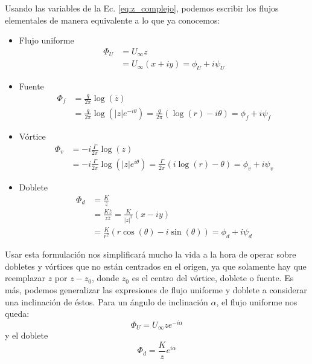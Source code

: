 Usando las variables de la Ec. \eqref{eq:z_complejo}, podemos escribir los flujos elementales de manera equivalente a lo que ya conocemos:
%
\begin{itemize}
\item Flujo uniforme
%
\begin{align}\label{eq:flujo_uniforme_complejo}
\Phi_U &= U_\infty z\nonumber\\
       &= U_\infty (x+iy) = \phi_U + i\psi_U
\end{align}
%
\item Fuente
%
\begin{align}\label{eq:fuente_complejo}
\Phi_f &= \frac{q}{2\pi} \log(\overline{z})\nonumber\\
       &= \frac{q}{2\pi} \log\left(|z|e^{-i\theta}\right) = \frac{q}{2\pi} \left(\log(r) - i\theta\right) = \phi_f + i\psi_f
\end{align}
%
\item Vórtice
%
\begin{align}\label{eq:vortice_complejo}
\Phi_v &= -i\frac{\Gamma}{2\pi} \log(z)\nonumber\\
       &= -i\frac{\Gamma}{2\pi} \log\left(|z|e^{i\theta}\right) = \frac{\Gamma}{2\pi} \left(i\log(r) - \theta\right) = \phi_v + i\psi_v
\end{align}
%
\item Doblete
%
\begin{align}\label{eq:doblete_complejo}
\Phi_d &= \frac{K}{z} \nonumber\\
       &= \frac{K\overline{z}}{z\overline{z}} = \frac{K}{|z|^2}(x-iy)\nonumber\\ 
       &= \frac{K}{r^2}(r\cos(\theta) - i\sin(\theta)) = \phi_d + i\psi_d
\end{align}

\end{itemize}

Usar esta formulación nos simplificará mucho la vida a la hora de operar sobre dobletes y vórtices que no están centrados en el origen, ya que solamente hay que reemplazar $z$ por $z-z_0$, donde $z_0$ es el centro del vórtice, doblete o fuente.
Es más, podemos generalizar las expresiones de flujo uniforme y doblete a considerar una inclinación de éstos. 
Para un ángulo de inclinación $\alpha$, el flujo uniforme nos queda:
%
\begin{equation} \label{eq:flujo_uniforme_complejo_angulo}
\Phi_U = U_\infty z e^{-i\alpha}
\end{equation}
%
y el doblete
\begin{equation} \label{eq:doblete_complejo_angulo}
\Phi_d = \frac{K}{z}e^{i\alpha} 
\end{equation}

